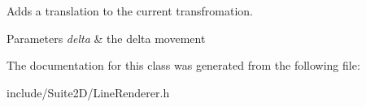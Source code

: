 Adds a translation to the current transfromation.


\begin{DoxyParams}{Parameters}
{\em delta} & the delta movement \\
\hline
\end{DoxyParams}


The documentation for this class was generated from the following file\+:\begin{DoxyCompactItemize}
\item 
include/\+Suite2\+D/Line\+Renderer.\+h\end{DoxyCompactItemize}
